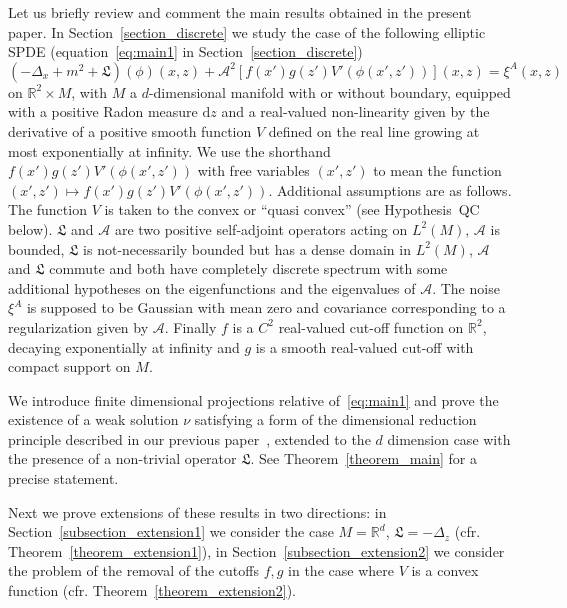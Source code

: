 \documentclass[a4paper,10pt]{article}
\newcommand{\mathd}{\mathrm{d}}
\begin{document}
Let us briefly review and comment the main results obtained in the present
paper. In Section~\ref{section_discrete} we study the case of the following
elliptic SPDE (equation~{\eqref{eq:main1}} in Section~\ref{section_discrete})
\[ (- \Delta_x + m^2 + \mathfrak{L}) (\phi) (x, z) + \mathcal{A}^2 [f (x') g
   (z') V' (\phi (x', z'))] (x, z) = \xi^A (x, z) \]
on $\mathbb{R}^2 \times M$, with $M$ a $d$-dimensional manifold with or
without boundary, equipped with a positive Radon measure $\mathd z$ and a
real-valued non-linearity given by the derivative of a positive smooth
function $V$ defined on the real line growing at most exponentially at
infinity. We use the shorthand $f (x') g (z') V' (\phi (x', z'))$ with free
variables $(x', z')$ to mean the function $(x', z') \mapsto f (x') g (z') V'
(\phi (x', z'))$. Additional assumptions are as follows. The function $V$ is
taken to the convex or ``quasi convex'' (see Hypothesis~QC below).
$\mathfrak{L}$ and $\mathcal{A}$ are two positive self-adjoint operators
acting on $L^2 (M)$, $\mathcal{A}$ is bounded, $\mathfrak{L}$ is
not-necessarily bounded but has a dense domain in $L^2 (M)$, $\mathcal{A}$ and
$\mathfrak{L}$ commute and both have completely discrete spectrum with some
additional hypotheses on the eigenfunctions and the eigenvalues of
$\mathcal{A}$. The noise $\xi^A$ is supposed to be Gaussian with mean zero and
covariance corresponding to a regularization given by $\mathcal{A}$. Finally
$f$ is a $C^2$ real-valued cut-off function on $\mathbb{R}^2$, decaying
exponentially at infinity and $g$ is a smooth real-valued cut-off with compact
support on $M$.

We introduce finite dimensional projections relative of~{\eqref{eq:main1}}
and prove the existence of a weak solution $\nu$ satisfying a form of the
dimensional reduction principle described in our previous
paper~{\cite{Albeverio2018elliptic}}, extended to the $d$ dimension case with
the presence of a non-trivial operator $\mathfrak{L}$. See
Theorem~\ref{theorem_main} for a precise statement.

Next we prove extensions of these results in two directions: in
Section~\ref{subsection_extension1} we consider the case $M =\mathbb{R}^d$,
$\mathfrak{L} = - \Delta_z$ (cfr. Theorem~\ref{theorem_extension1}), in
Section~\ref{subsection_extension2} we consider the problem of the removal of
the cutoffs $f, g$ in the case where $V$ is a convex function (cfr.
Theorem~\ref{theorem_extension2}).

\
\end{document}

